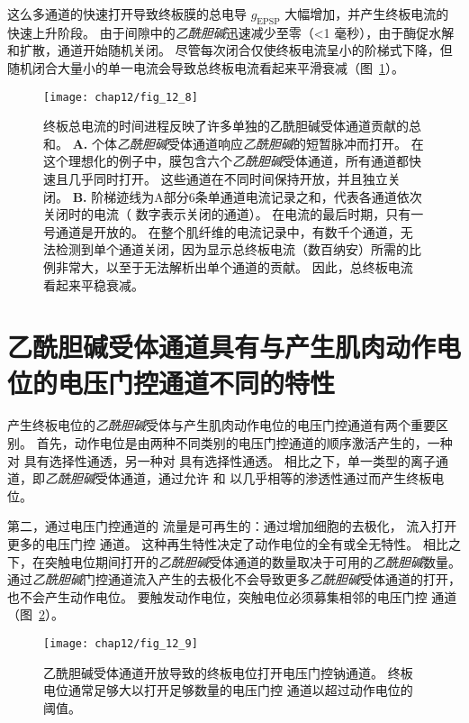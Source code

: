 这么多通道的快速打开导致终板膜的总电导 $ g_{\text{EPSP}} $ 大幅增加，并产生终板电流的快速上升阶段。
由于间隙中的\textit{乙酰胆碱}迅速减少至零（<1 毫秒），由于酶促水解和扩散，通道开始随机关闭。
尽管每次闭合仅使终板电流呈小的阶梯式下降，但随机闭合大量小的单一电流会导致总终板电流看起来平滑衰减（图~\ref{fig:12_8}）。


\begin{figure}[htbp]
	\centering
	\texttt{[image: chap12/fig\_12\_8]}
	\caption{终板总电流的时间进程反映了许多单独的乙酰胆碱受体通道贡献的总和\cite{colquhoun1981fast}。
		\textbf{A.} 个体\textit{乙酰胆碱}受体通道响应\textit{乙酰胆碱}的短暂脉冲而打开。
		在这个理想化的例子中，膜包含六个\textit{乙酰胆碱}受体通道，所有通道都快速且几乎同时打开。
		这些通道在不同时间保持开放，并且独立关闭。
		\textbf{B.} 阶梯迹线为A部分6条单通道电流记录之和，代表各通道依次关闭时的电流（ 数字表示关闭的通道）。
		在电流的最后时期，只有一号通道是开放的。
		在整个肌纤维的电流记录中，有数千个通道，无法检测到单个通道关闭，因为显示总终板电流（数百纳安）所需的比例非常大，以至于无法解析出单个通道的贡献。
		因此，总终板电流看起来平稳衰减。}
	\label{fig:12_8}
\end{figure}



\section{乙酰胆碱受体通道具有与产生肌肉动作电位的电压门控通道不同的特性}

产生终板电位的\textit{乙酰胆碱}受体与产生肌肉动作电位的电压门控通道有两个重要区别。
首先，动作电位是由两种不同类别的电压门控通道的顺序激活产生的，一种对  具有选择性通透，另一种对  具有选择性通透。
相比之下，单一类型的离子通道，即\textit{乙酰胆碱}受体通道，通过允许  和  以几乎相等的渗透性通过而产生终板电位。


第二，通过电压门控通道的  流量是可再生的：通过增加细胞的去极化， 流入打开更多的电压门控  通道。
这种再生特性决定了动作电位的全有或全无特性。
相比之下，在突触电位期间打开的\textit{乙酰胆碱}受体通道的数量取决于可用的\textit{乙酰胆碱}数量。
 通过\textit{乙酰胆碱}门控通道流入产生的去极化不会导致更多\textit{乙酰胆碱}受体通道的打开，也不会产生动作电位。
要触发动作电位，突触电位必须募集相邻的电压门控  通道（图~\ref{fig:12_9}）。


\begin{figure}[htbp]
	\centering
	\texttt{[image: chap12/fig\_12\_9]}
	\caption{乙酰胆碱受体通道开放导致的终板电位打开电压门控钠通道。
		终板电位通常足够大以打开足够数量的电压门控  通道以超过动作电位的阈值\cite{alberts2017molecular}。}
	\label{fig:12_9}
\end{figure}


